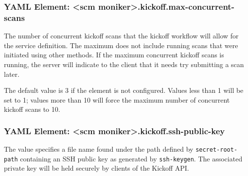 \subsubsection{YAML Element: <scm moniker>.kickoff.max-concurrent-scans}\label{sec:yaml-kickoff-max-concurrent-scans}
The number of concurrent kickoff scans that the kickoff workflow will allow for the service definition.
The maximum does not include running scans that were initiated using other methods. If the
maximum concurrent kickoff scans is running, the server will indicate to the client that it needs
try submitting a scan later.

The default value is 3 if the element is not configured.  Values less than 1 will be
set to 1; values more than 10 will force the maximum number of concurrent kickoff scans
to 10.  


\subsubsection{YAML Element: <scm moniker>.kickoff.ssh-public-key}\label{sec:yaml-kickoff-ssh-public-key}
The value specifies a file name found under the path defined by \texttt{secret-root-path}
containing an SSH public key as generated by \texttt{ssh-keygen}.  The associated private key will be
held securely by clients of the Kickoff API.

